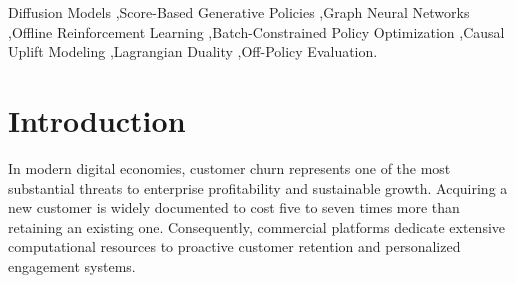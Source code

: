 \documentclass[preprint,12pt,3p]{elsarticle}
\begin{document}
\begin{frontmatter}
\begin{abstract}
the historical logging policy on every benchmark (+13.50\% to +107.50\%). On KuaiRand, our score-based diffusion policy equipped with Tweedie CATE guidance achieves a highly significant $+1.99\%$ DR lift ($p = 1.93 \times 10^{-5}$) over unguided diffusion with sub-3 microsecond real-time inference latency. In zero-degree cold-start partitions, GNN-Bandit achieves up to \textbf{+42.87\%} lift over matrix factorization baselines. Diff-GNN-Bandit establishes an empirically validated and theoretically grounded blueprint for high-stakes offline decision support.
\end{abstract}

\begin{keyword}
Diffusion Models \sep Score-Based Generative Policies \sep Graph Neural Networks \sep Offline Reinforcement Learning \sep Batch-Constrained Policy Optimization \sep Causal Uplift Modeling \sep Lagrangian Duality \sep Off-Policy Evaluation.
\end{keyword}

\end{frontmatter}

\section{Introduction}
\label{sec:intro}

In modern digital economies, customer churn represents one of the most substantial threats to enterprise profitability and sustainable growth. Acquiring a new customer is widely documented to cost five to seven times more than retaining an existing one. Consequently, commercial platforms dedicate extensive computational resources to proactive customer retention and personalized engagement systems.
\end{document}
